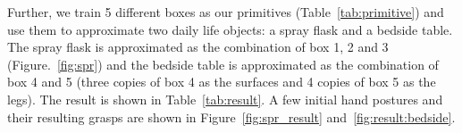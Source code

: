 Further, we train 5 different boxes as our primitives (Table~\ref{tab:primitive}) and use them to approximate two daily life objects: a spray flask and a bedside table. The spray flask is approximated as the combination of box 1, 2 and 3 (Figure.~\ref{fig:spr}) and the bedside table is approximated as the combination of box 4 and 5 (three copies of box 4 as the surfaces and 4 copies of box 5 as the legs). The result is shown in Table~\ref{tab:result}. A few initial hand postures and their resulting grasps are shown in Figure~\ref{fig:spr_result} and~\ref{fig:result:bedside}.

\begin{figure}
\centering

    \hspace{0.005in}
    \hspace{0.005in}


\end{figure}
